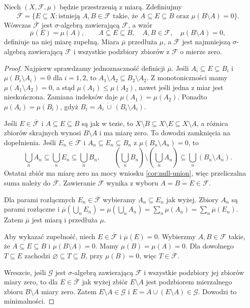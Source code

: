 \begin{twierdzenie}
\label{thm:completion}
Niech $(X,\mathcal F,\mu)$ będzie przestrzenią z miarą.
Zdefiniujmy
\[
\overline{\mathcal F}
=\{E\subseteq X:\text{istnieją }A,B\in\mathcal F
\text{ takie, że }A\subseteq E\subseteq B
\text{ oraz }\mu(B\setminus A)=0\}.
\]
Wówczas $\overline{\mathcal F}$ jest $\sigma$-algebrą zawierającą
$\mathcal F$, a wzór
\[
\overline\mu(E)=\mu(A),\qquad
A\subseteq E\subseteq B,\quad A,B\in\mathcal F,
\quad\mu(B\setminus A)=0,
\]
definiuje na niej miarę zupełną. Miara $\overline\mu$
przedłuża $\mu$, a $\overline{\mathcal F}$ jest najmniejszą
$\sigma$-algebrą zawierającą $\mathcal F$ i wszystkie
podzbiory zbiorów z $\mathcal F$ o mierze zero.
\end{twierdzenie}
\begin{proof}
Najpierw sprawdzamy jednoznaczność definicji $\overline\mu$.
Jeśli $A_i\subseteq E\subseteq B_i$ i
$\mu(B_i\setminus A_i)=0$ dla $i=1,2$, to
$A_1\setminus A_2\subseteq B_2\setminus A_2$.
Z monotoniczności mamy $\mu(A_1\setminus A_2)=0$,
a stąd $\mu(A_1)\leq\mu(A_2)$, nawet jeśli
jedna z miar jest nieskończona. Zamiana indeksów
daje $\mu(A_1)=\mu(A_2)$. Ponadto
$\mu(A_i)=\mu(B_i)$, gdyż
$B_i=A_i\,\dot\cup\,(B_i\setminus A_i)$.

Jeśli $E\in\overline{\mathcal F}$ i
$A\subseteq E\subseteq B$ są jak w tezie, to
$X\setminus B\subseteq X\setminus E\subseteq X\setminus A$,
a różnica zbiorów skrajnych wynosi $B\setminus A$
i ma miarę zero. To dowodzi zamknięcia na dopełnienia.
Jeśli $E_n\in\overline{\mathcal F}$ i
$A_n\subseteq E_n\subseteq B_n$ z
$\mu(B_n\setminus A_n)=0$, to
\[
\bigcup_nA_n\subseteq\bigcup_nE_n\subseteq\bigcup_nB_n,
\qquad
\left(\bigcup_nB_n\right)\setminus\left(\bigcup_nA_n\right)
\subseteq\bigcup_n(B_n\setminus A_n).
\]
Ostatni zbiór ma miarę zero na mocy wniosku
\ref{cor:null-union}, więc przeliczalna suma należy do
$\overline{\mathcal F}$. Zawieranie $\mathcal F$ wynika
z wyboru $A=B=E\in\mathcal F$.

Dla parami rozłącznych $E_n\in\overline{\mathcal F}$
wybieramy $A_n\subseteq E_n$ jak wyżej. Zbiory $A_n$
są parami rozłączne i
$\overline\mu(\bigcup_nE_n)=\mu(\bigcup_nA_n)
=\sum_n\mu(A_n)=\sum_n\overline\mu(E_n)$.
Zatem $\overline\mu$ jest miarą i przedłuża $\mu$.

Aby wykazać zupełność, niech $E\in\overline{\mathcal F}$
i $\overline\mu(E)=0$. Wybierzmy $A,B\in\mathcal F$
takie, że $A\subseteq E\subseteq B$ i
$\mu(B\setminus A)=0$. Mamy $\mu(B)=\mu(A)=0$.
Dla dowolnego $T\subseteq E$ zachodzi
$\varnothing\subseteq T\subseteq B$, przy $\mu(B)=0$,
więc $T\in\overline{\mathcal F}$.

Wreszcie, jeśli $\mathcal G$ jest $\sigma$-algebrą zawierającą
$\mathcal F$ i wszystkie podzbiory jej zbiorów miary zero,
to dla $E\in\overline{\mathcal F}$ jak wyżej zbiór
$E\setminus A$ jest podzbiorem mierzalnego zbioru
$B\setminus A$ miary zero. Zatem $E\setminus A\in\mathcal G$
i $E=A\cup(E\setminus A)\in\mathcal G$. Dowodzi to minimalności.
\end{proof}

